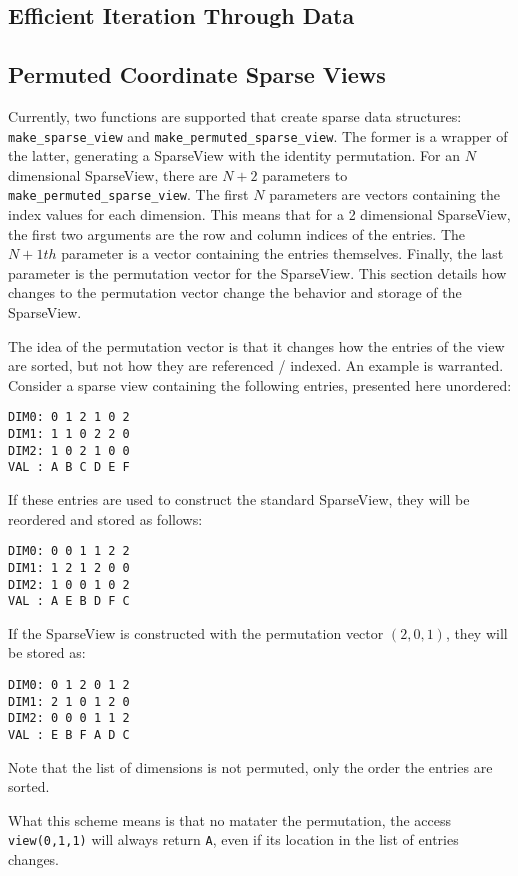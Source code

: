 \subsection{Efficient Iteration Through Data}


\subsection{Permuted Coordinate Sparse Views}

Currently, two functions are supported that create sparse data structures: \verb.make_sparse_view. and \verb.make_permuted_sparse_view..
The former is a wrapper of the latter, generating a SparseView with the identity permutation.
For an $N$ dimensional SparseView, there are $N+2$ parameters to \verb.make_permuted_sparse_view..
The first $N$ parameters are vectors containing the index values for each dimension. 
This means that for a 2 dimensional SparseView, the first two arguments are the row and column indices of the entries.
The $N+1th$ parameter is a vector containing the entries themselves. 
Finally, the last parameter is the permutation vector for the SparseView. 
This section details how changes to the permutation vector change the behavior and storage of the SparseView.

The idea of the permutation vector is that it changes how the entries of the view are sorted, but not how they are referenced / indexed.
An example is warranted. 
Consider a sparse view containing the following entries, presented here unordered:
\begin{lstlisting}
DIM0: 0 1 2 1 0 2
DIM1: 1 1 0 2 2 0
DIM2: 1 0 2 1 0 0
VAL : A B C D E F 
\end{lstlisting}
If these entries are used to construct the standard SparseView, they will be reordered and stored as follows:
\begin{lstlisting}
DIM0: 0 0 1 1 2 2
DIM1: 1 2 1 2 0 0
DIM2: 1 0 0 1 0 2
VAL : A E B D F C
\end{lstlisting}
If the SparseView is constructed with the permutation vector $(2,0,1)$, they will be stored as:
\begin{lstlisting}
DIM0: 0 1 2 0 1 2
DIM1: 2 1 0 1 2 0
DIM2: 0 0 0 1 1 2
VAL : E B F A D C
\end{lstlisting}
Note that the list of dimensions is not permuted, only the order the entries are sorted. 

What this scheme means is that no matater the permutation, the access \verb.view(0,1,1). will always return \verb.A., even if its location in the list of entries changes.

